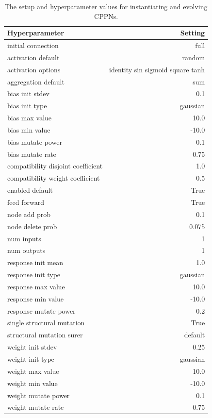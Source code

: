 \documentclass{article}
\begin{document}
\begin{table}[!ht]
\centering
\begin{tabular}{lr}
\toprule
Hyperparameter & Setting \\
\midrule
initial connection & full \\
activation default & random \\
activation options & identity sin sigmoid square tanh \\
aggregation default & sum \\
bias init stdev & 0.1 \\
bias init type & gaussian \\
bias max value & 10.0 \\
bias min value & -10.0 \\
bias mutate power & 0.1 \\
bias mutate rate & 0.75 \\
compatibility disjoint coefficient & 1.0 \\
compatibility weight coefficient & 0.5 \\
enabled default & True \\
feed forward & True \\
node add prob & 0.1 \\
node delete prob & 0.075 \\
num inputs & 1 \\
num outputs & 1 \\
response init mean & 1.0 \\
response init type & gaussian \\
response max value & 10.0 \\
response min value & -10.0 \\
response mutate power & 0.2 \\
single structural mutation & True \\
structural mutation surer & default \\
weight init stdev & 0.25 \\
weight init type & gaussian \\
weight max value & 10.0 \\
weight min value & -10.0 \\
weight mutate power & 0.1 \\
weight mutate rate & 0.75 \\
\bottomrule
\end{tabular}
\caption{The setup and hyperparameter values for instantiating and evolving CPPNs.}
\label{tab:cppn_hyperparams}
\end{table}
\end{document}
